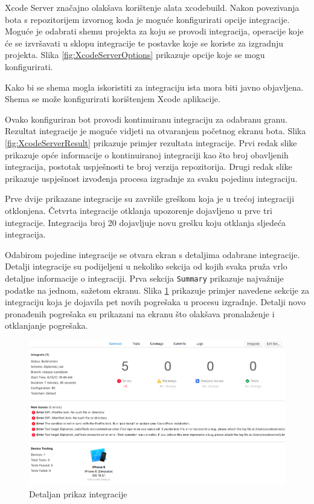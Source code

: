 \documentclass[times, utf8, diplomski, numeric]{fer}
\begin{document}
Xcode Server značajno olakšava korištenje alata xcodebuild. Nakon povezivanja bota s repozitorijem izvornog koda je moguće konfigurirati opcije integracije. Moguće je odabrati shemu projekta za koju se provodi integracija, operacije koje će se izvršavati u sklopu integracije te postavke koje se koriste za izgradnju projekta. Slika \ref{fig:XcodeServerOptions} prikazuje opcije koje se mogu konfigurirati.

Kako bi se shema mogla iskoristiti za integraciju ista mora biti javno objavljena. Shema se može konfigurirati korištenjem Xcode aplikacije.

Ovako konfiguriran bot provodi kontinuiranu integraciju za odabranu granu. Rezultat integracije je moguće vidjeti na otvaranjem početnog ekranu bota. Slika \ref{fig:XcodeServerResult} prikazuje primjer rezultata integracije. Prvi redak slike prikazuje opće informacije o kontinuiranoj integraciji kao što broj obavljenih integracija, postotak uspješnosti te broj verzija repozitorija. Drugi redak slike prikazuje uspješnost izvođenja procesa izgradnje za svaku pojedinu integraciju.

Prve dvije prikazane integracije su završile greškom koja je u trećoj integraciji otklonjena. Četvrta integracije otklanja upozorenje dojavljeno u prve tri integracije. Integracija broj 20 dojavljuje novu grešku koju otklanja sljedeća integracija.

Odabirom pojedine integracije se otvara ekran s detaljima odabrane integracije. Detalji integracije su podijeljeni u nekoliko sekcija od kojih svaka pruža vrlo detaljne informacije o integraciji. Prva sekcija \verb|Summary| prikazuje najvažnije podatke na jednom, sažetom ekranu. Slika \ref{fig:XcodeServerSingleIntegration} prikazuje primjer navedene sekcije za integraciju koja je dojavila pet novih pogrešaka u procesu izgradnje. Detalji novo pronađenih pogrešaka su prikazani na ekranu što olakšava pronalaženje i otklanjanje pogrešaka.

\begin{figure}
\centering
\includegraphics[scale=0.4]{XcodeServerSingleIntegration}
\caption{Detaljan prikaz integracije}
\label{fig:XcodeServerSingleIntegration}
\end{figure}
\end{document}
